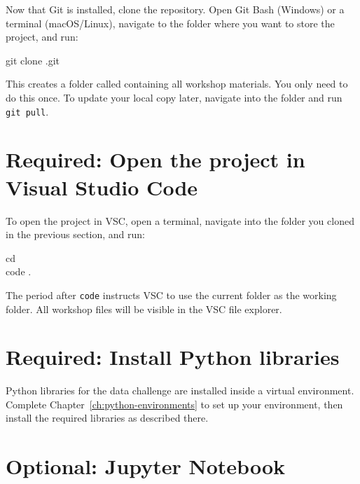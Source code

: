 \vs

Now that Git is installed, clone the \ProjectName{} 
repository. Open Git Bash (Windows) or a terminal (macOS/Linux),
navigate to the folder where you want to store the project, and run:

{\ttfamily \noindent
git clone \ProjectGit.git
}

This creates a folder called \texttt{\ProjectFolder} containing all
workshop materials. You only need to do this once. To update your
local copy later, navigate into the folder and run \texttt{git pull}.

\section{Required: Open the \ProjectName{} project in Visual Studio Code}\label{sec:vscstart}

To open the \ProjectName{} project in VSC, open a terminal, navigate into the
\texttt{\ProjectFolder} folder you cloned in the previous section,
and run:

{\ttfamily \noindent
cd \ProjectFolder \\
code .
}

The period after \texttt{code} instructs VSC to use the current folder
as the working folder. All workshop files will be visible in the VSC
file explorer.

\section{Required: Install Python libraries}\label{sec:libraries}

Python libraries for the data challenge are installed inside a virtual
environment. Complete Chapter~\ref{ch:python-environments} to set up
your environment, then install the required libraries as described there.

\section{Optional: Jupyter Notebook}\label{sec:jupyter}

